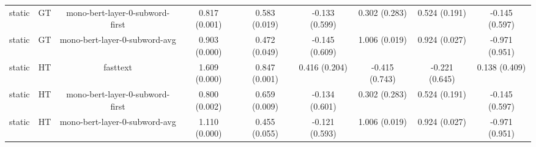 \begin{sidewaystable}[htb]
\begin{tabular}{@{}ccccccccc@{}}
        static & GT & mono-bert-layer-0-subword-first & 0.817 (0.001) & 0.583 (0.019) & -0.133 (0.599) & 0.302 (0.283) & 0.524 (0.191) & -0.145 (0.597) \\
        static & GT & mono-bert-layer-0-subword-avg & 0.903 (0.000) & 0.472 (0.049) & -0.145 (0.609) & 1.006 (0.019) & 0.924 (0.027) & -0.971 (0.951) \\
        static & HT & fasttext & 1.609 (0.000) & 0.847 (0.001) & 0.416 (0.204) & -0.415 (0.743) & -0.221 (0.645) & 0.138 (0.409) \\
        static & HT & mono-bert-layer-0-subword-first & 0.800 (0.002) & 0.659 (0.009) & -0.134 (0.601) & 0.302 (0.283) & 0.524 (0.191) & -0.145 (0.597) \\
        static & HT & mono-bert-layer-0-subword-avg & 1.110 (0.000) & 0.455 (0.055) & -0.121 (0.593) & 1.006 (0.019) & 0.924 (0.027) & -0.971 (0.951) \\
        \bottomrule
    \end{tabular}
\end{sidewaystable}